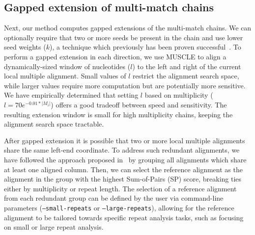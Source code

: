 \documentclass[12pt,journal,letterpaper,onecolumn, draftcls]{IEEEtran}
\begin{document}
\subsection{Gapped extension of multi-match chains}
Next, our method computes gapped extensions of the multi-match chains.
We can optionally require that two or more seeds be present
in the chain and use lower seed weights ($k$), a technique which previously has
been proven
successful~\cite{ref-blastz,ref-gappedblast,ref-blat}.  To perform a
gapped extension in each direction, we use MUSCLE to align a dynamically-sized window
of nucleotides ($l$) to the left and right of the current local
multiple alignment.  Small values of $l$ restrict the alignment search
space, while larger values require more computation but are
potentially more sensitive.  We have empirically determined that
setting $l$ based on multiplicity ($l = 70e^{-0.01*|M_{i}|}$) offers a
good tradeoff between speed and sensitivity.  The resulting extension
window is small for high multiplicity chains,
keeping the alignment search space tractable.

After gapped extension it is possible that two or more
local multiple alignments share the same left-end coordinate. To address such redundant alignments, we have followed
the approach proposed in~\cite{ref-related1} by grouping all alignments which share at least one aligned column. Then, we can select the reference alignment
as the alignment in the group with the highest Sum-of-Pairs (SP) score, breaking ties either by multiplicity or repeat length. The selection of a reference alignment from each redundant group can be defined by the user via command-line parameters (\texttt{--small-repeats} or \texttt{--large-repeats}), allowing for the reference alignment to be tailored towards specific repeat analysis tasks, such as focusing on small or large repeat analysis.
\end{document}
